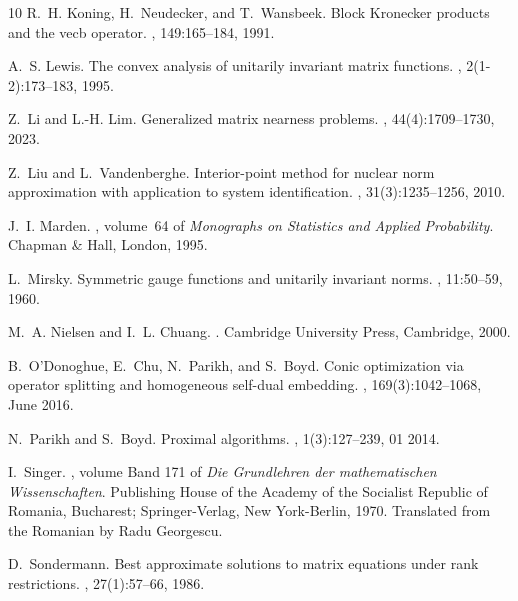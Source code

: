 \documentclass[11pt,reqno]{amsart}
\theoremstyle{definition}
\numberwithin{equation}{section}
\begin{document}
\begin{thebibliography}{10}
R.~H. Koning, H.~Neudecker, and T.~Wansbeek.
\newblock Block {K}ronecker products and the vecb operator.
, 149:165--184, 1991.

A.~S. Lewis.
\newblock The convex analysis of unitarily invariant matrix functions.
, 2(1-2):173--183, 1995.

Z.~Li and L.-H. Lim.
\newblock Generalized matrix nearness problems.
, 44(4):1709--1730, 2023.

Z.~Liu and L.~Vandenberghe.
\newblock Interior-point method for nuclear norm approximation with application
  to system identification.
,
  31(3):1235--1256, 2010.

J.~I. Marden.
, volume~64 of {\em Monographs
  on Statistics and Applied Probability}.
\newblock Chapman \& Hall, London, 1995.

L.~Mirsky.
\newblock Symmetric gauge functions and unitarily invariant norms.
, 11:50--59, 1960.

M.~A. Nielsen and I.~L. Chuang.
.
\newblock Cambridge University Press, Cambridge, 2000.

B.~O'Donoghue, E.~Chu, N.~Parikh, and S.~Boyd.
\newblock Conic optimization via operator splitting and homogeneous self-dual
  embedding.
,
  169(3):1042--1068, June 2016.

N.~Parikh and S.~Boyd.
\newblock Proximal algorithms.
, 1(3):127--239, 01 2014.

I.~Singer.
, volume Band 171 of {\em Die Grundlehren der mathematischen
  Wissenschaften}.
\newblock Publishing House of the Academy of the Socialist Republic of Romania,
  Bucharest; Springer-Verlag, New York-Berlin, 1970.
\newblock Translated from the Romanian by Radu Georgescu.

D.~Sondermann.
\newblock Best approximate solutions to matrix equations under rank
  restrictions.
, 27(1):57--66, 1986.


\end{thebibliography}
\end{document}
